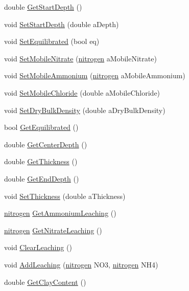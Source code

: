 \begin{DoxyCompactItemize}
\item 
double \hyperlink{classsoil_layer_a067dc1539ac09a475b678ef6d67b2812}{GetStartDepth} ()
\item 
void \hyperlink{classsoil_layer_a3c7e4208dd19b461a5fd4be87d4547b3}{SetStartDepth} (double aDepth)
\item 
void \hyperlink{classsoil_layer_ac58f88c6110ed8e40e12dd469fca7600}{SetEquilibrated} (bool eq)
\item 
void \hyperlink{classsoil_layer_a71a3ce45c63d49c19234d3223b8690af}{SetMobileNitrate} (\hyperlink{classnitrogen}{nitrogen} aMobileNitrate)
\item 
void \hyperlink{classsoil_layer_ad9bd5250fd7e8c9b22c33c0b619d4cc6}{SetMobileAmmonium} (\hyperlink{classnitrogen}{nitrogen} aMobileAmmonium)
\item 
void \hyperlink{classsoil_layer_a89720f6c433431218ca16b7ab1463bf5}{SetMobileChloride} (double aMobileChloride)
\item 
void \hyperlink{classsoil_layer_ad1473f9c34f74acd1a7a73037d486b08}{SetDryBulkDensity} (double aDryBulkDensity)
\item 
bool \hyperlink{classsoil_layer_a0ed01627fab5acb65cb417906abb17ba}{GetEquilibrated} ()
\item 
double \hyperlink{classsoil_layer_a1789c88edae9f3ef01bc1b321bc71913}{GetCenterDepth} ()
\item 
double \hyperlink{classsoil_layer_a2505c534964ced0b3d5a77c9c9ef3424}{GetThickness} ()
\item 
double \hyperlink{classsoil_layer_ab046484e00090278933a7e253e9fc004}{GetEndDepth} ()
\item 
void \hyperlink{classsoil_layer_ae1569e3fcbab8c73a3fdd6d6f6e7921a}{SetThickness} (double aThickness)
\item 
\hyperlink{classnitrogen}{nitrogen} \hyperlink{classsoil_layer_add04d61e6c1bb7294341d18070a0373f}{GetAmmoniumLeaching} ()
\item 
\hyperlink{classnitrogen}{nitrogen} \hyperlink{classsoil_layer_aa65c1b73e58aa539a36d46d3733ce1b8}{GetNitrateLeaching} ()
\item 
void \hyperlink{classsoil_layer_a1d47dbea22d315b19238696a7fb5bbe6}{ClearLeaching} ()
\item 
void \hyperlink{classsoil_layer_ad66e3bbf7d6898f9528374655d90f482}{AddLeaching} (\hyperlink{classnitrogen}{nitrogen} NO3, \hyperlink{classnitrogen}{nitrogen} NH4)
\item 
double \hyperlink{classsoil_layer_a75861976e9ef03938056de1307b11711}{GetClayContent} ()

\end{DoxyCompactItemize}
